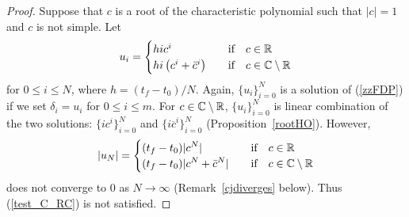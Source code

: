 \begin{proof}
Suppose that $c$ is a root of the characteristic polynomial such that
$|c|=1$ and $c$ is not simple.  Let
\[
u_i = \begin{cases}
h i c^i & \quad \text{if} \quad c \in \mathbb{R} \\
h i \left( c^i + \bar{c}^i \right) & \quad \text{if}\quad  c \in \mathbb{C}
\setminus \mathbb{R}
\end{cases}
\]
for $0 \leq i \leq N$, where $h = (t_f-t_0)/N$.
Again, $\{u_i\}_{i=0}^N$ is a solution of (\ref{zzFDP}) if we set
$\delta_i = u_i$ for $0\leq i \leq m$.
For $c \in \mathbb{C} \setminus \mathbb{R}$, $\displaystyle \{u_i\}_{i=0}^N$ is linear
combination of the two solutions: 
$\displaystyle \{i c^i\}_{i=0}^N$ and
$\displaystyle \{i \overline{c}^i\}_{i=0}^N$ (Proposition~\ref{rootHO}).
However,
\[
|u_N| =
\begin{cases}
\displaystyle
(t_f-t_0) |c^N| & \quad \text{if} \quad c \in \mathbb{R} \\
\displaystyle
(t_f-t_0) |c^N + \bar{c}^N| & \quad \text{if} \quad c \in \mathbb{C} \setminus \mathbb{R}
\end{cases}
\]
does not converge to $0$ as $N \to \infty$ (Remark~\ref{cjdiverges} below).
Thus (\ref{test_C_RC}) is not satisfied.
\end{proof}

